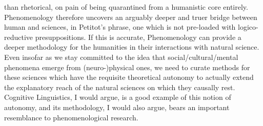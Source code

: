 {{than rhetorical, on pain of  being quarantined
from a humanistic core entirely.
}
Phenomenology therefore uncovers
an arguably deeper and truer bridge between human and  sciences,
in Petitot's phrase, one which is not pre-loaded with logico-reductive presuppositions.
If this is accurate, Phenomenology can provide a deeper methodology
for the humanities in their interactions with natural science.
Even insofar as we stay committed to the idea
that social/cultural/mental phenomena emerge from (neuro-)physical ones, we
need to curate methods for these  sciences which have the requisite
theoretical autonomy to actually extend the explanatory reach of the natural
sciences on which they causally rest.  Cognitive Linguistics, I would argue,
is a good example of this notion of autonomy, and its methodology, I would
also argue, bears an important resemblance to phenomenological research.
}

